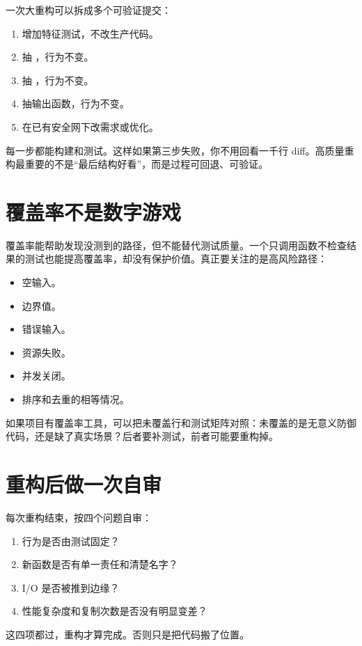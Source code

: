 一次大重构可以拆成多个可验证提交：

\begin{enumerate}
  \item 增加特征测试，不改生产代码。
  \item 抽 ，行为不变。
  \item 抽 ，行为不变。
  \item 抽输出函数，行为不变。
  \item 在已有安全网下改需求或优化。
\end{enumerate}

每一步都能构建和测试。这样如果第三步失败，你不用回看一千行 diff。高质量重构最重要的不是“最后结构好看”，而是过程可回退、可验证。

\section{覆盖率不是数字游戏}

覆盖率能帮助发现没测到的路径，但不能替代测试质量。一个只调用函数不检查结果的测试也能提高覆盖率，却没有保护价值。真正要关注的是高风险路径：

\begin{itemize}
  \item 空输入。
  \item 边界值。
  \item 错误输入。
  \item 资源失败。
  \item 并发关闭。
  \item 排序和去重的相等情况。
\end{itemize}

如果项目有覆盖率工具，可以把未覆盖行和测试矩阵对照：未覆盖的是无意义防御代码，还是缺了真实场景？后者要补测试，前者可能要重构掉。

\section{重构后做一次自审}

每次重构结束，按四个问题自审：

\begin{enumerate}
  \item 行为是否由测试固定？
  \item 新函数是否有单一责任和清楚名字？
  \item I/O 是否被推到边缘？
  \item 性能复杂度和复制次数是否没有明显变差？
\end{enumerate}

这四项都过，重构才算完成。否则只是把代码搬了位置。
